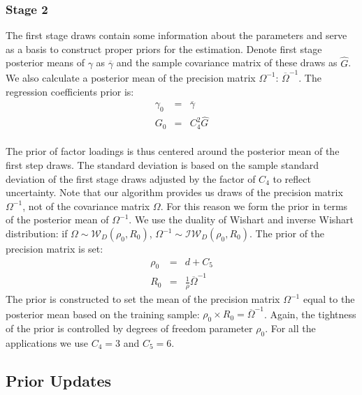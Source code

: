 \subsubsection{Stage 2}
The first stage draws contain some information about the parameters and serve as a basis to construct proper priors for the estimation.
Denote first stage posterior means of $\gamma$ as $\overline{\gamma}$ and the sample covariance matrix of these draws as $\widehat{G}$. 
We also calculate a posterior mean of the precision matrix $\Omega^{-1}$: $\overline{\Omega}^{-1}$. 
The regression coefficients prior is:
\begin{eqnarray*}
	\gamma_{0} &=& \overline{\gamma} \\ 
	G_{0} &=& C_{4}^{2} \widehat{G}
\end{eqnarray*}\\
The prior of factor loadings is thus centered around the posterior mean of the first step draws. 
The standard deviation is based on the sample standard deviation of the first stage draws adjusted by the factor of $C_{4}$ to reflect uncertainty.
Note that our algorithm provides us draws of the precision matrix $\Omega^{-1}$, not of the covariance matrix $\Omega$. 
For this reason we form the prior in terms of the posterior mean of ${\Omega}^{-1}$. 
We use the duality of Wishart and inverse Wishart distribution: if $\Omega \sim \mathcal{W}_D\left(\rho_0, R_0 \right)$, $\Omega^{-1} \sim \mathcal{IW}_D\left(\rho_0, R_0 \right)$. 
The prior of the precision matrix is set:
\begin{eqnarray*}
	\rho_{0} &=& d + C_{5} \\ 
	R_{0} &=& \frac{1}{\rho} \overline{\Omega}^{-1}
\end{eqnarray*}
The prior is constructed to set the mean of the precision matrix $\Omega^{-1}$ equal to the posterior mean based on the training sample: $\rho_{0} \times R_{0} =\overline{\Omega}^{-1} $. 
Again, the tightness of the prior is controlled by degrees of freedom parameter $\rho_{0}$. 
For all the applications we use $C_{4} = 3$ and $C_5 = 6$.

\subsection{Prior Updates}

